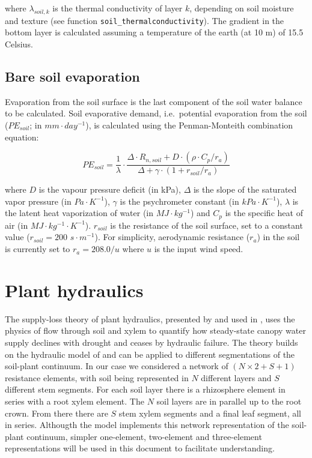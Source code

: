 \documentclass[]{book}
\begin{document}
where \(\lambda_{soil,k}\) is the thermal conductivity of layer \(k\),
depending on soil moisture and texture (see function
\texttt{soil\_thermalconductivity}). The gradient in the bottom layer is
calculated assuming a temperature of the earth (at 10 m) of 15.5
Celsius.

\section{Bare soil evaporation}\label{bare-soil-evaporation}

Evaporation from the soil surface is the last component of the soil
water balance to be calculated. Soil evaporative demand, i.e.~potential
evaporation from the soil (\(PE_{soil}\); in \(mm\cdot day^{-1}\)), is
calculated using the Penman-Monteith combination equation:

\begin{equation}
PE_{soil} = \frac{1}{\lambda} \cdot \frac{\Delta \cdot R_{n,soil} + D \cdot (\rho \cdot C_p/r_a)}{\Delta + \gamma \cdot (1 + r_{soil}/r_a)}
\end{equation}

where \(D\) is the vapour pressure deficit (in kPa), \(\Delta\) is the
slope of the saturated vapor pressure (in \(Pa \cdot K^{-1}\)),
\(\gamma\) is the psychrometer constant (in \(kPa\cdot K^{-1}\)),
\(\lambda\) is the latent heat vaporization of water (in
\(MJ\cdot kg^{-1}\)) and \(C_p\) is the specific heat of air (in
\(MJ\cdot kg^{-1}\cdot K^{-1}\)). \(r_{soil}\) is the resistance of the
soil surface, set to a constant value (\(r_{soil} = 200\)
\(s\cdot m^{-1}\)). For simplicity, aerodynamic resistance (\(r_a\)) in
the soil is currently set to \(r_a = 208.0/u\) where \(u\) is the input
wind speed.

\chapter{Plant hydraulics}\label{plant-hydraulics}

The supply-loss theory of plant hydraulics, presented by
\citet{Sperry2016} and used in \citet{Sperry2016}, uses the physics of
flow through soil and xylem to quantify how steady-state canopy water
supply declines with drought and ceases by hydraulic failure. The theory
builds on the hydraulic model of \citet{Sperry1998} and can be applied
to different segmentations of the soil-plant continuum. In our case we
considered a network of \((N \times 2 + S + 1)\) resistance elements,
with soil being represented in \(N\) different layers and \(S\)
different stem segments. For each soil layer there is a rhizosphere
element in series with a root xylem element. The \(N\) soil layers are
in parallel up to the root crown. From there there are \(S\) stem xylem
segments and a final leaf segment, all in series. Althougth the model
implements this network representation of the soil-plant continuum,
simpler one-element, two-element and three-element representations will
be used in this document to facilitate understanding.
\end{document}
